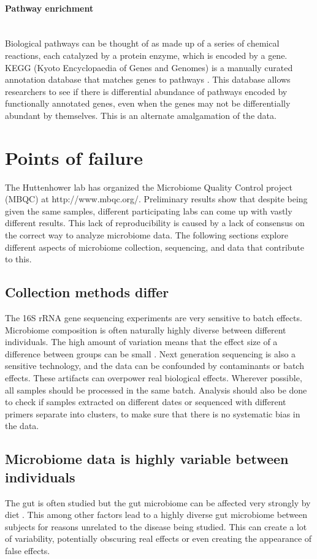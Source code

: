 \FloatBarrier

\paragraph{Pathway enrichment}\mbox{}\\
Biological pathways can be thought of as made up of a series of chemical reactions, each catalyzed by a protein enzyme, which is encoded by a gene. KEGG (Kyoto Encyclopaedia of Genes and Genomes) is a manually curated annotation database that matches genes to pathways \cite{kanehisa2000kegg}. This database allows researchers to see if there is differential abundance of pathways encoded by functionally annotated genes, even when the genes may not be differentially abundant by themselves. This is an alternate amalgamation of the data.

\section{Points of failure}
The Huttenhower lab has organized the Microbiome Quality Control project (MBQC) at http://www.mbqc.org/. Preliminary results show that despite being given the same samples, different participating labs can come up with vastly different results. This lack of reproducibility is caused by a lack of consensus on the correct way to analyze microbiome data. The following sections explore different aspects of microbiome collection, sequencing, and data that contribute to this.

\subsection{Collection methods differ}
The 16S rRNA gene sequencing experiments are very sensitive to batch effects. Microbiome composition is often naturally highly diverse between different individuals. The high amount of variation means that the effect size of a difference between groups can be small \cite{fernandes2014unifying}. Next generation sequencing is also a sensitive technology, and the data can be confounded by contaminants \cite{salter2014reagent} or batch effects. These artifacts can overpower real biological effects. Wherever possible, all samples should be processed in the same batch. Analysis should also be done to check if samples extracted on different dates or sequenced with different primers separate into clusters, to make sure that there is no systematic bias in the data.

\subsection{Microbiome data is highly variable between individuals}
The gut is often studied but the gut microbiome can be affected very strongly by diet \cite{turnbaugh2009effect}. This among other factors lead to a highly diverse gut microbiome between subjects for reasons unrelated to the disease being studied. This can create a lot of variability, potentially obscuring real effects or even creating the appearance of false effects.

